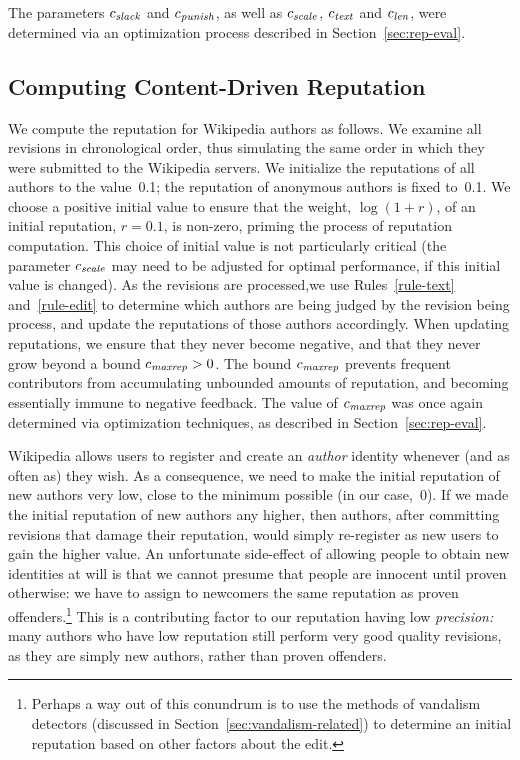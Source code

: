 The parameters ${c_{{\text{\textit{slack}}}}}$ and ${c_{{\text{\textit{punish}}}}}$, as well as ${c_{{\text{\textit{scale}}}}}$,
${c_{{\text{\textit{text}}}}}$ and ${c_{{\text{\textit{len}}}}}$, were determined via an optimization
process described in Section~\ref{sec:rep-eval}.

\subsection{Computing Content-Driven Reputation}

We compute the reputation for Wikipedia authors as follows.
We examine all revisions in chronological order, thus simulating the
same order in which they were submitted to the Wikipedia servers.
We initialize the reputations of all authors to the value~0.1;
the reputation of anonymous authors is fixed to~0.1.
We choose a positive initial value to ensure that the weight,
$\log (1+r)$, of an initial reputation, $r = 0.1$, is non-zero, priming
the process of reputation computation.
This choice of initial value is not particularly critical (the
parameter ${c_{{\text{\textit{scale}}}}}$ may need to be adjusted for optimal performance,
if this initial value is changed).
As the revisions are processed,we use Rules~\ref{rule-text}
and~\ref{rule-edit} to determine which authors are being
judged by the revision being process,
and update the reputations of those authors accordingly.
When updating reputations, we ensure that they never become negative,
and that they never grow beyond a bound ${c_{{\text{\textit{maxrep}}}}} > 0$.
The bound ${c_{{\text{\textit{maxrep}}}}}$ prevents frequent contributors from
accumulating unbounded amounts of reputation, and becoming essentially
immune to negative feedback.
The value of ${c_{{\text{\textit{maxrep}}}}}$ was once again determined via
optimization techniques, as described in Section~\ref{sec:rep-eval}.

Wikipedia allows users to register and create an {\em author\/}
identity whenever (and as often as) they wish.
As a consequence, we need to make the initial reputation of new authors
very low, close to the minimum possible (in our case,~0).
If we made the initial reputation of new authors any higher,
then authors, after committing revisions that damage their reputation,
would simply re-register as new users to gain the higher value.
An unfortunate side-effect of allowing people to obtain new identities
at will is that we cannot presume that people are innocent until
proven otherwise: we have to assign to newcomers the same reputation
as proven offenders.\footnote{Perhaps a way out of this conundrum
is to use the methods of vandalism detectors (discussed
in Section~\ref{sec:vandalism-related}) to determine an
initial reputation based on other factors about the edit.}
This is a contributing factor to our reputation having low
{\em precision:\/} many authors who have low reputation still perform
very good quality revisions, as they are simply new authors, rather than
proven offenders.


